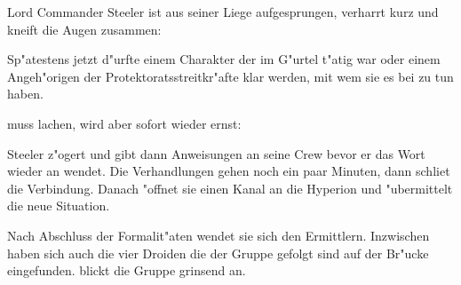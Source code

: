 
Lord Commander Steeler ist aus seiner Liege aufgesprungen, verharrt kurz und kneift die Augen zusammen:


Sp"atestens jetzt d"urfte einem Charakter der im G"urtel t"atig war oder einem Angeh"origen der Protektoratsstreitkr"afte klar werden, mit wem sie es bei \xl{} zu tun haben.

\xl{} muss lachen, wird aber sofort wieder ernst:


Steeler z"ogert und gibt dann Anweisungen an seine Crew bevor er das Wort wieder an \xl{} wendet. Die Verhandlungen gehen noch ein paar Minuten, dann schlie\3t \xl{} die Verbindung. Danach "offnet sie einen Kanal an die Hyperion und "ubermittelt die neue Situation.

Nach Abschluss der Formalit"aten wendet sie sich den Ermittlern. Inzwischen haben sich auch die vier Droiden die der Gruppe gefolgt sind auf der Br"ucke eingefunden. \xl{} blickt die Gruppe grinsend an.

\vfill\pagebreak

